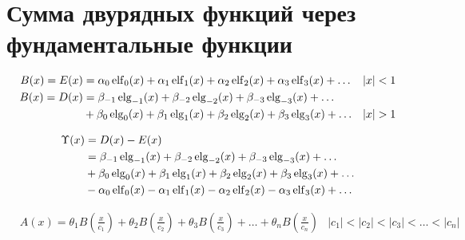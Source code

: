 
\section{Сумма двурядных функций через фундаментальные функции}

\begin{equation*} \begin{aligned}
B(x) = E(x) &=
  \alpha_0 \elf_0(x)
+ \alpha_1 \elf_1(x)
+ \alpha_2 \elf_2(x)
+ \alpha_3 \elf_3(x)
+ \ldots &
&|x| < 1 \\
%
B(x) = D(x) &=   
  \beta_{-1} \elg_{-1}(x)
+ \beta_{-2} \elg_{-2}(x)
+ \beta_{-3} \elg_{-3}(x)
+ \ldots \\ &
+ \beta_0 \elg_0(x)
+ \beta_1 \elg_1(x)
+ \beta_2 \elg_2(x)
+ \beta_3 \elg_3(x)
+ \ldots &
&|x| > 1 \\
\end{aligned} \end{equation*}

\begin{equation*} \begin{aligned}
\Upsilon(x) &= D(x) - E(x) \\ &=
  \beta_{-1} \operatorname{elg}_{-1}(x)
+ \beta_{-2} \operatorname{elg}_{-2}(x)
+ \beta_{-3} \operatorname{elg}_{-3}(x)
+ \ldots \\ &
+ \beta_0 \operatorname{elg}_0(x)
+ \beta_1 \operatorname{elg}_1(x)
+ \beta_2 \operatorname{elg}_2(x)
+ \beta_3 \operatorname{elg}_3(x)
+ \ldots \\ &
- \alpha_0 \operatorname{elf}_0(x)
- \alpha_1 \operatorname{elf}_1(x)
- \alpha_2 \operatorname{elf}_2(x)
- \alpha_3 \operatorname{elf}_3(x)
+ \ldots \\
\end{aligned} \end{equation*}

\begin{equation*} \begin{aligned}
&A(x) =
  \theta_1 B{\left(\frac{x}{c_1} \right)}
+ \theta_2 B{\left(\frac{x}{c_2} \right)}
+ \theta_3 B{\left(\frac{x}{c_3} \right)}
+ \ldots
+ \theta_n B{\left(\frac{x}{c_n} \right)}
%
&|c_1| < |c_2| < |c_3| < \ldots < |c_n|
\end{aligned} \end{equation*}

